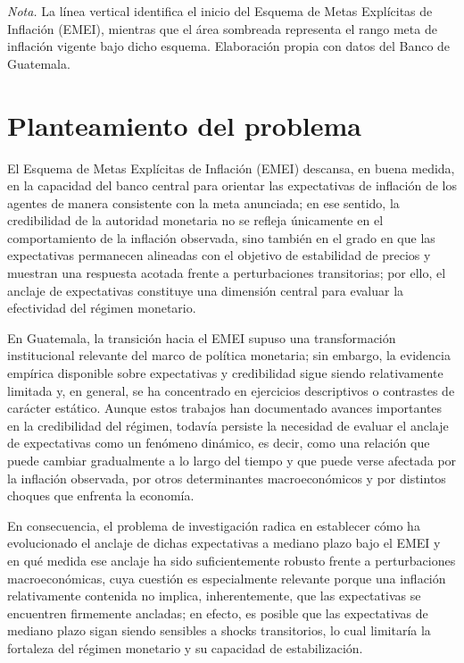 \documentclass[
  10.5pt,
  letterpaper,
  twocolumn]{article}
\begin{document}
\footnotesize

\emph{Nota.} La línea vertical identifica el inicio del Esquema de Metas
Explícitas de Inflación (EMEI), mientras que el área sombreada
representa el rango meta de inflación vigente bajo dicho esquema.
Elaboración propia con datos del Banco de Guatemala. \normalsize

\section{Planteamiento del problema}\label{planteamiento-del-problema}

El Esquema de Metas Explícitas de Inflación (EMEI) descansa, en buena
medida, en la capacidad del banco central para orientar las expectativas
de inflación de los agentes de manera consistente con la meta anunciada;
en ese sentido, la credibilidad de la autoridad monetaria no se refleja
únicamente en el comportamiento de la inflación observada, sino también
en el grado en que las expectativas permanecen alineadas con el objetivo
de estabilidad de precios y muestran una respuesta acotada frente a
perturbaciones transitorias; por ello, el anclaje de expectativas
constituye una dimensión central para evaluar la efectividad del régimen
monetario.

En Guatemala, la transición hacia el EMEI supuso una transformación
institucional relevante del marco de política monetaria; sin embargo, la
evidencia empírica disponible sobre expectativas y credibilidad sigue
siendo relativamente limitada y, en general, se ha concentrado en
ejercicios descriptivos o contrastes de carácter estático. Aunque estos
trabajos han documentado avances importantes en la credibilidad del
régimen, todavía persiste la necesidad de evaluar el anclaje de
expectativas como un fenómeno dinámico, es decir, como una relación que
puede cambiar gradualmente a lo largo del tiempo y que puede verse
afectada por la inflación observada, por otros determinantes
macroeconómicos y por distintos choques que enfrenta la economía.

En consecuencia, el problema de investigación radica en establecer cómo
ha evolucionado el anclaje de dichas expectativas a mediano plazo bajo
el EMEI y en qué medida ese anclaje ha sido suficientemente robusto
frente a perturbaciones macroeconómicas, cuya cuestión es especialmente
relevante porque una inflación relativamente contenida no implica,
inherentemente, que las expectativas se encuentren firmemente ancladas;
en efecto, es posible que las expectativas de mediano plazo sigan siendo
sensibles a shocks transitorios, lo cual limitaría la fortaleza del
régimen monetario y su capacidad de estabilización.
\end{document}

